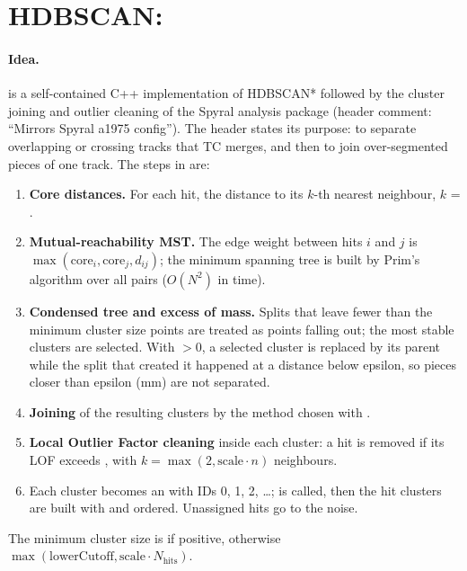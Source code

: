\section{HDBSCAN: }
\label{sec:pr:hdbscan}

\paragraph{Idea.}  is a self-contained C++ implementation of HDBSCAN* followed by
the cluster joining and outlier cleaning of the Spyral analysis package (header comment: ``Mirrors Spyral
a1975 config''). The header states its purpose: to separate overlapping or crossing tracks that TC merges,
and then to join over-segmented pieces of one track. The steps in  are:
\begin{enumerate}
\item \textbf{Core distances.} For each hit, the distance to its $k$-th nearest neighbour, $k$ =
  .
\item \textbf{Mutual-reachability MST.} The edge weight between hits $i$ and $j$ is
  $\max(\mathrm{core}_i, \mathrm{core}_j, d_{ij})$; the minimum spanning tree is built by Prim's algorithm over all pairs
  ($O(N^2)$ in time).
\item \textbf{Condensed tree and excess of mass.} Splits that leave fewer than the minimum cluster size
  points are treated as points falling out; the most stable clusters are selected. With
   $>0$, a selected cluster is replaced by its parent while the split
  that created it happened at a distance below epsilon, so pieces closer than epsilon (mm) are not separated.
\item \textbf{Joining} of the resulting clusters by the method chosen with .
\item \textbf{Local Outlier Factor cleaning} inside each cluster: a hit is removed if its LOF exceeds
  , with $k=\max(2, \mathrm{scale}\cdot n)$ neighbours.
\item Each cluster becomes an  with IDs 0, 1, 2, \ldots; 
  is called, then the hit clusters are built with  and ordered. Unassigned hits
  go to the noise.
\end{enumerate}
The minimum cluster size is  if positive, otherwise
$\max(\mathrm{lowerCutoff}, \mathrm{scale}\cdot N_\mathrm{hits})$.

